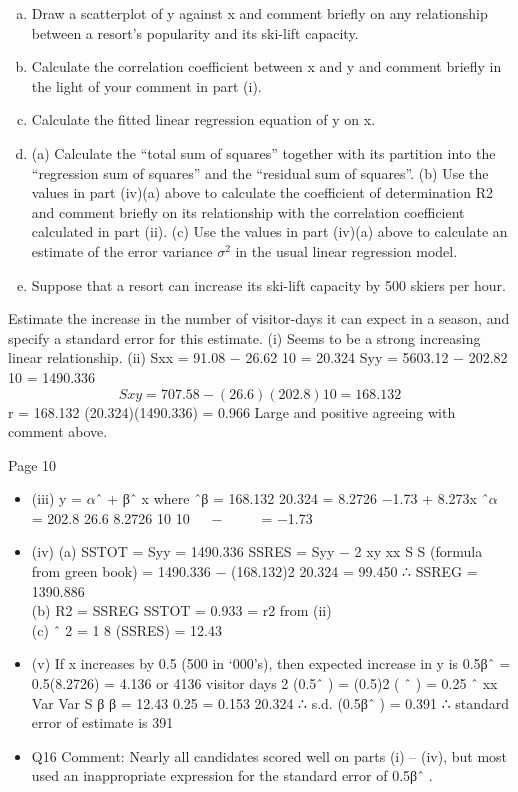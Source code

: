 \documentclass[a4paper,12pt]{article}
\begin{document}
\begin{enumerate}[(a)]
\item Draw a scatterplot of y against x and comment briefly on any relationship
between a resort’s popularity and its ski-lift capacity. 
\item Calculate the correlation coefficient between x and y and comment briefly
in the light of your comment in part (i). 
\item Calculate the fitted linear regression equation of y on x. 
\item (a) Calculate the “total sum of squares” together with its partition into
the “regression sum of squares” and the “residual sum of squares”.
(b) Use the values in part (iv)(a) above to calculate the coefficient of
determination R2 and comment briefly on its relationship with the
correlation coefficient calculated in part (ii).
(c) Use the values in part (iv)(a) above to calculate an estimate of the
error variance $\sigma^2$ in the usual linear regression model. 
\item Suppose that a resort can increase its ski-lift capacity by 500 skiers per
hour.
\end{enumerate}
Estimate the increase in the number of visitor-days it can expect in a
season, and specify a standard error for this estimate. 
 (i)
Seems to be a strong increasing linear relationship.
(ii) Sxx = 91.08 −
26.62
10
= 20.324
Syy = 5603.12 −
202.82
10
= 1490.336
\[Sxy = 707.58 − (26.6)(202.8)
10
= 168.132\]
r =
168.132
(20.324)(1490.336)
= 0.966
Large and positive agreeing with comment above.

Page 10
\begin{itemize}
    \item 
(iii) y = $\alpha$ˆ + βˆ x where
ˆβ
=
168.132
20.324
= 8.2726
−1.73 + 8.273x
ˆ$\alpha$ =
202.8 26.6
8.2726
10 10
  −  
 
= −1.73
\item (iv) (a) SSTOT = Syy = 1490.336
SSRES = Syy −
2
xy
xx
S
S
(formula from green book)
= 1490.336 −
(168.132)2
20.324
= 99.450
∴ SSREG = 1390.886\\
(b) R2 =
SSREG
SSTOT
= 0.933 = r2 from (ii)\\
(c) \sum ˆ 2 =
1
8
(SSRES) = 12.43
\item (v) If x increases by 0.5 (500 in ‘000’s), then expected increase in y is 0.5βˆ
= 0.5(8.2726) = 4.136 or 4136 visitor days
2
(0.5ˆ ) = (0.5)2 ( ˆ ) = 0.25 ˆ
xx
Var Var
S
\sum 
β β
=
12.43
0.25 = 0.153
20.324
∴ s.d. (0.5βˆ ) = 0.391
∴ standard error of estimate is 391
\item Q16 Comment: Nearly all candidates scored well on parts (i) – (iv), but most used
an inappropriate expression for the standard error of 0.5βˆ .
\end{itemize}
\end{document}
